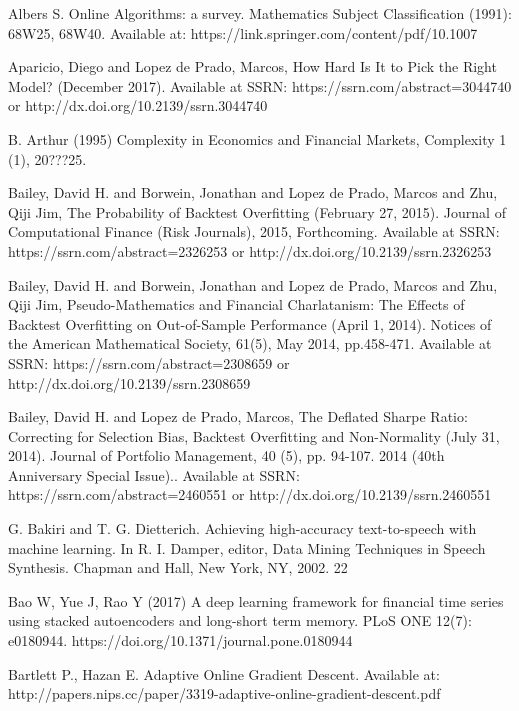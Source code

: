\documentclass[a4paper,latin]{paper}
\begin{document}
\newpage
\begin{thebibliography}{bibliography}

Albers S. Online Algorithms: a survey. Mathematics Subject Classification (1991): 68W25, 
68W40. Available at: https://link.springer.com/content/pdf/10.1007%

Aparicio, Diego and Lopez de Prado, Marcos, How Hard Is It to Pick the Right Model? (December 2017). Available at SSRN: https://ssrn.com/abstract=3044740 or http://dx.doi.org/10.2139/ssrn.3044740

B. Arthur (1995) Complexity in Economics and Financial Markets, Complexity 1 (1), 20???25.

Bailey, David H. and Borwein, Jonathan and Lopez de Prado, Marcos and Zhu, Qiji Jim, The Probability of Backtest Overfitting (February 27, 2015). Journal of Computational Finance (Risk Journals), 2015, Forthcoming. Available at SSRN: https://ssrn.com/abstract=2326253 or http://dx.doi.org/10.2139/ssrn.2326253

Bailey, David H. and Borwein, Jonathan and Lopez de Prado, Marcos and Zhu, Qiji Jim, Pseudo-Mathematics and Financial Charlatanism: The Effects of Backtest Overfitting on Out-of-Sample Performance (April 1, 2014). Notices of the American Mathematical Society, 61(5), May 2014, pp.458-471. Available at SSRN: https://ssrn.com/abstract=2308659 or http://dx.doi.org/10.2139/ssrn.2308659

Bailey, David H. and Lopez de Prado, Marcos, The Deflated Sharpe Ratio: Correcting for Selection Bias, Backtest Overfitting and Non-Normality (July 31, 2014). Journal of Portfolio Management, 40 (5), pp. 94-107. 2014 (40th Anniversary Special Issue).. Available at SSRN: https://ssrn.com/abstract=2460551 or http://dx.doi.org/10.2139/ssrn.2460551

G. Bakiri and T. G. Dietterich. Achieving high-accuracy text-to-speech with machine learning. In R. I. Damper, editor, Data Mining Techniques in Speech Synthesis. Chapman and Hall, New York, NY, 2002. 22

Bao W, Yue J, Rao Y (2017) A deep learning framework for financial time series using stacked autoencoders and long-short term memory. PLoS ONE 12(7): e0180944. https://doi.org/10.1371/journal.pone.0180944

Bartlett P., Hazan E. Adaptive Online Gradient Descent. Available at: http://papers.nips.cc/paper/3319-adaptive-online-gradient-descent.pdf


\end{thebibliography}
\end{document}

